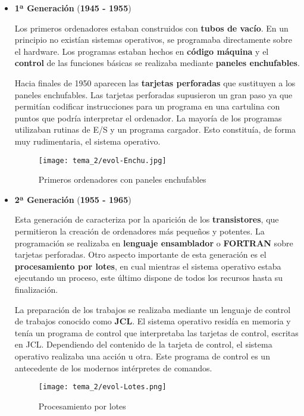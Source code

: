 \begin{itemize}
    \item \textbf{1ª Generación} (\textbf{1945 - 1955})

    Los primeros ordenadores estaban construidos con \textbf{tubos de vacío}. En un principio no existían sistemas operativos, se programaba directamente sobre el hardware. Los programas estaban hechos en \textbf{código máquina} y el \textbf{control} de las funciones básicas se realizaba mediante \textbf{paneles enchufables}.

    Hacia finales de 1950 aparecen las \textbf{tarjetas perforadas} que sustituyen a los paneles enchufables. Las tarjetas perforadas supusieron un gran paso ya que permitían codificar instrucciones para un programa en una cartulina con puntos que podría interpretar el ordenador. La mayoría de los programas utilizaban rutinas de E/S y un programa cargador. Esto constituía, de forma muy rudimentaria, el sistema operativo.

    \begin{figure}[ht]
        \centering
        \texttt{[image: tema\_2/evol-Enchu.jpg]}
        \caption{Primeros ordenadores con paneles enchufables}
    \end{figure}

    \item \textbf{2ª Generación} (\textbf{1955 - 1965})

    Esta generación de caracteriza por la aparición de los \textbf{transistores}, que permitieron la creación de ordenadores más pequeños y potentes. La programación se realizaba en \textbf{lenguaje ensamblador} o \textbf{FORTRAN} sobre tarjetas perforadas. Otro aspecto importante de esta generación es el \textbf{procesamiento por lotes}, en cual mientras el sistema operativo estaba ejecutando un proceso, este último dispone de todos los recursos hasta su finalización.

    La preparación de los trabajos se realizaba mediante un lenguaje de control de trabajos conocido como \textbf{JCL}. El sistema operativo residía en memoria y tenía un programa de control que interpretaba las tarjetas de control, escritas en JCL. Dependiendo del contenido de la tarjeta de control, el sistema operativo realizaba una acción u otra. Este programa de control es un antecedente de los modernos intérpretes de comandos.

      \begin{figure}[ht]
        \centering
        \texttt{[image: tema\_2/evol-Lotes.png]}
        \caption{Procesamiento por lotes}
    \end{figure}


\end{itemize}
